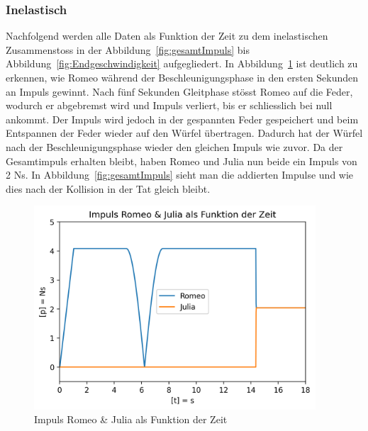 \documentclass[../main.tex]{subfiles}
\begin{document}
    \newpage
    \subsubsection{Inelastisch}
    Nachfolgend werden alle Daten als Funktion der Zeit zu dem inelastischen Zusammenstoss in der
    Abbildung~\ref{fig:gesamtImpuls} bis Abbildung~\ref{fig:Endgeschwindigkeit}
    aufgegliedert.
    \newline
    \newline
    In Abbildung~\ref{fig:ImpulsRomeoJulia} ist deutlich zu erkennen, wie Romeo
    während der Beschleunigungsphase in den ersten Sekunden an Impuls gewinnt. 
    Nach fünf Sekunden Gleitphase stösst Romeo auf die Feder, wodurch er abgebremst
    wird und Impuls verliert, bis er schliesslich bei null ankommt. Der Impuls wird
    jedoch in der gespannten Feder gespeichert und beim Entspannen der Feder wieder
    auf den Würfel übertragen. Dadurch hat der Würfel nach der Beschleunigungsphase 
    wieder den gleichen Impuls wie zuvor. Da der Gesamtimpuls erhalten bleibt, haben Romeo und Julia nun beide ein Impuls von 2 Ns. In Abbildung~\ref{fig:gesamtImpuls} sieht man die addierten Impulse und wie dies nach der Kollision in der Tat gleich bleibt.
    \begin{figure}[H]
        \begin{center}
            \centerline{\includegraphics[width=105mm]{./images/Inelastisch/ImpulsRomeoJulia}}
            \caption{Impuls Romeo \& Julia als Funktion der Zeit}
            \label{fig:ImpulsRomeoJulia}
        \end{center}
    \end{figure}
\end{document}
